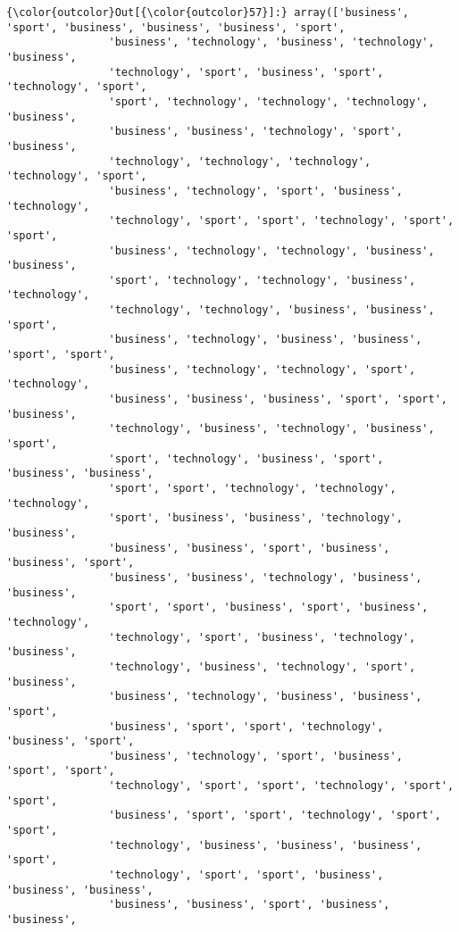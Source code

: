 \documentclass[11pt]{article}
\begin{document}
\begin{Verbatim}[commandchars=\\\{\}]
{\color{outcolor}Out[{\color{outcolor}57}]:} array(['business', 'sport', 'business', 'business', 'business', 'sport',
                'business', 'technology', 'business', 'technology', 'business',
                'technology', 'sport', 'business', 'sport', 'technology', 'sport',
                'sport', 'technology', 'technology', 'technology', 'business',
                'business', 'business', 'technology', 'sport', 'business',
                'technology', 'technology', 'technology', 'technology', 'sport',
                'business', 'technology', 'sport', 'business', 'technology',
                'technology', 'sport', 'sport', 'technology', 'sport', 'sport',
                'business', 'technology', 'technology', 'business', 'business',
                'sport', 'technology', 'technology', 'business', 'technology',
                'technology', 'technology', 'business', 'business', 'sport',
                'business', 'technology', 'business', 'business', 'sport', 'sport',
                'business', 'technology', 'technology', 'sport', 'technology',
                'business', 'business', 'business', 'sport', 'sport', 'business',
                'technology', 'business', 'technology', 'business', 'sport',
                'sport', 'technology', 'business', 'sport', 'business', 'business',
                'sport', 'sport', 'technology', 'technology', 'technology',
                'sport', 'business', 'business', 'technology', 'business',
                'business', 'business', 'sport', 'business', 'business', 'sport',
                'business', 'business', 'technology', 'business', 'business',
                'sport', 'sport', 'business', 'sport', 'business', 'technology',
                'technology', 'sport', 'business', 'technology', 'business',
                'technology', 'business', 'technology', 'sport', 'business',
                'business', 'technology', 'business', 'business', 'sport',
                'business', 'sport', 'sport', 'technology', 'business', 'sport',
                'business', 'technology', 'sport', 'business', 'sport', 'sport',
                'technology', 'sport', 'sport', 'technology', 'sport', 'sport',
                'business', 'sport', 'sport', 'technology', 'sport', 'sport',
                'technology', 'business', 'business', 'business', 'sport',
                'technology', 'sport', 'sport', 'business', 'business', 'business',
                'business', 'business', 'sport', 'business', 'business',

\end{Verbatim}
\end{document}
